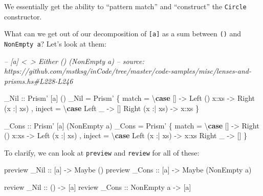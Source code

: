 \documentclass[]{article}
\newenvironment{Shaded}{}{}
\newcommand{\CommentTok}[1]{\textcolor[rgb]{0.38,0.63,0.69}{\textit{#1}}}
\newcommand{\DataTypeTok}[1]{\textcolor[rgb]{0.56,0.13,0.00}{#1}}
\newcommand{\FunctionTok}[1]{\textcolor[rgb]{0.02,0.16,0.49}{#1}}
\newcommand{\KeywordTok}[1]{\textcolor[rgb]{0.00,0.44,0.13}{\textbf{#1}}}
\newcommand{\NormalTok}[1]{#1}
\newcommand{\OtherTok}[1]{\textcolor[rgb]{0.00,0.44,0.13}{#1}}
\begin{document}
We essentially get the ability to ``pattern match'' and ``construct'' the
\texttt{Circle} constructor.

What can we get out of our decomposition of \texttt{{[}a{]}} as a sum between
\texttt{()} and \texttt{NonEmpty\ a}? Let's look at them:

\begin{Shaded}
\begin{Highlighting}[]
\CommentTok{-- [a] <~> Either () (NonEmpty a)}
\CommentTok{-- source: https://github.com/mstksg/inCode/tree/master/code-samples/misc/lenses-and-prisms.hs#L228-L246}

\OtherTok{_Nil ::} \DataTypeTok{Prism'}\NormalTok{ [a] ()}
\NormalTok{_Nil }\FunctionTok{=} \DataTypeTok{Prism'}
\NormalTok{    \{ match  }\FunctionTok{=}\NormalTok{ \textbackslash{}}\KeywordTok{case}
\NormalTok{        []              }\OtherTok{->} \DataTypeTok{Left}\NormalTok{ ()}
\NormalTok{        x}\FunctionTok{:}\NormalTok{xs            }\OtherTok{->} \DataTypeTok{Right}\NormalTok{ (x }\FunctionTok{:|}\NormalTok{ xs)}
\NormalTok{    , inject }\FunctionTok{=}\NormalTok{ \textbackslash{}}\KeywordTok{case}
        \DataTypeTok{Left}\NormalTok{ _          }\OtherTok{->}\NormalTok{ []}
        \DataTypeTok{Right}\NormalTok{ (x }\FunctionTok{:|}\NormalTok{ xs) }\OtherTok{->}\NormalTok{ x}\FunctionTok{:}\NormalTok{xs}
\NormalTok{    \}}

\OtherTok{_Cons ::} \DataTypeTok{Prism'}\NormalTok{ [a] (}\DataTypeTok{NonEmpty}\NormalTok{ a)}
\NormalTok{_Cons }\FunctionTok{=} \DataTypeTok{Prism'}
\NormalTok{    \{ match  }\FunctionTok{=}\NormalTok{ \textbackslash{}}\KeywordTok{case}
\NormalTok{        []              }\OtherTok{->} \DataTypeTok{Right}\NormalTok{ ()}
\NormalTok{        x}\FunctionTok{:}\NormalTok{xs            }\OtherTok{->} \DataTypeTok{Left}\NormalTok{ (x }\FunctionTok{:|}\NormalTok{ xs)}
\NormalTok{    , inject }\FunctionTok{=}\NormalTok{ \textbackslash{}}\KeywordTok{case}
        \DataTypeTok{Left}\NormalTok{  (x }\FunctionTok{:|}\NormalTok{ xs) }\OtherTok{->}\NormalTok{ x}\FunctionTok{:}\NormalTok{xs}
        \DataTypeTok{Right}\NormalTok{ _         }\OtherTok{->}\NormalTok{ []}
\NormalTok{    \}}
\end{Highlighting}
\end{Shaded}

To clarify, we can look at \texttt{preview} and \texttt{review} for all of
these:

\begin{Shaded}
\begin{Highlighting}[]
\NormalTok{preview}\OtherTok{ _Nil  ::}\NormalTok{ [a] }\OtherTok{->} \DataTypeTok{Maybe}\NormalTok{ ()}
\NormalTok{preview}\OtherTok{ _Cons ::}\NormalTok{ [a] }\OtherTok{->} \DataTypeTok{Maybe}\NormalTok{ (}\DataTypeTok{NonEmpty}\NormalTok{ a)}

\NormalTok{review}\OtherTok{  _Nil  ::}\NormalTok{ ()         }\OtherTok{->}\NormalTok{ [a]}
\NormalTok{review}\OtherTok{  _Cons ::} \DataTypeTok{NonEmpty}\NormalTok{ a }\OtherTok{->}\NormalTok{ [a]}
\end{Highlighting}
\end{Shaded}
\end{document}
